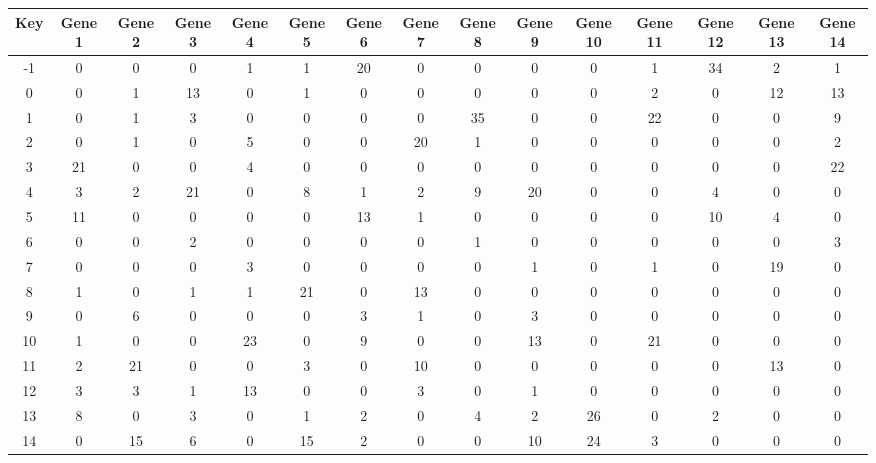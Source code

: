 \begin{tabular}{|c|c|c|c|c|c|c|c|c|c|c|c|c|c|c|}
\hline
Key & Gene 1 & Gene 2 & Gene 3 & Gene 4 & Gene 5 & Gene 6 & Gene 7 & Gene 8 & Gene 9 & Gene 10 & Gene 11 & Gene 12 & Gene 13 & Gene 14 \\
\hline
-1 & 0 & 0 & 0 & 1 & 1 & 20 & 0 & 0 & 0 & 0 & 1 & 34 & 2 & 1 \\
0 & 0 & 1 & 13 & 0 & 1 & 0 & 0 & 0 & 0 & 0 & 2 & 0 & 12 & 13 \\
1 & 0 & 1 & 3 & 0 & 0 & 0 & 0 & 35 & 0 & 0 & 22 & 0 & 0 & 9 \\
2 & 0 & 1 & 0 & 5 & 0 & 0 & 20 & 1 & 0 & 0 & 0 & 0 & 0 & 2 \\
3 & 21 & 0 & 0 & 4 & 0 & 0 & 0 & 0 & 0 & 0 & 0 & 0 & 0 & 22 \\
4 & 3 & 2 & 21 & 0 & 8 & 1 & 2 & 9 & 20 & 0 & 0 & 4 & 0 & 0 \\
5 & 11 & 0 & 0 & 0 & 0 & 13 & 1 & 0 & 0 & 0 & 0 & 10 & 4 & 0 \\
6 & 0 & 0 & 2 & 0 & 0 & 0 & 0 & 1 & 0 & 0 & 0 & 0 & 0 & 3 \\
7 & 0 & 0 & 0 & 3 & 0 & 0 & 0 & 0 & 1 & 0 & 1 & 0 & 19 & 0 \\
8 & 1 & 0 & 1 & 1 & 21 & 0 & 13 & 0 & 0 & 0 & 0 & 0 & 0 & 0 \\
9 & 0 & 6 & 0 & 0 & 0 & 3 & 1 & 0 & 3 & 0 & 0 & 0 & 0 & 0 \\
10 & 1 & 0 & 0 & 23 & 0 & 9 & 0 & 0 & 13 & 0 & 21 & 0 & 0 & 0 \\
11 & 2 & 21 & 0 & 0 & 3 & 0 & 10 & 0 & 0 & 0 & 0 & 0 & 13 & 0 \\
12 & 3 & 3 & 1 & 13 & 0 & 0 & 3 & 0 & 1 & 0 & 0 & 0 & 0 & 0 \\
13 & 8 & 0 & 3 & 0 & 1 & 2 & 0 & 4 & 2 & 26 & 0 & 2 & 0 & 0 \\
14 & 0 & 15 & 6 & 0 & 15 & 2 & 0 & 0 & 10 & 24 & 3 & 0 & 0 & 0 \\
\hline
\end{tabular}